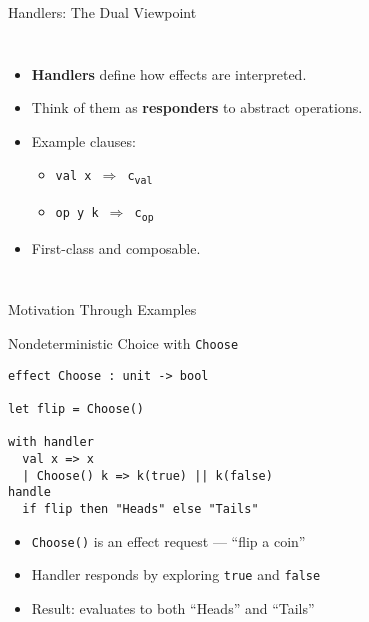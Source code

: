\begin{frame}{Handlers: The Dual Viewpoint}
  \begin{columns}[c]
    \begin{itemize}
      \item \textbf{Handlers} define how effects are interpreted.
      \vspace{0.5em}
      \item Think of them as \textbf{responders} to abstract operations.
      \vspace{0.5em}
      \item Example clauses:
      \begin{itemize}
        \item \texttt{val x $\Rightarrow$ c\textsubscript{val}}
        \item \texttt{op y k $\Rightarrow$ c\textsubscript{op}}
      \end{itemize}
      \vspace{0.5em}
      \item First-class and composable.
    \end{itemize}

    \centering
    \resizebox{0.8\linewidth}{!}{%
  
}
    
  \end{columns}
\end{frame}

\begin{frame}[fragile]{Motivation Through Examples}
\vspace{-0.5em}
\begin{block}{Nondeterministic Choice with \texttt{Choose}}
\begin{verbatim}
effect Choose : unit -> bool

let flip = Choose()

with handler
  val x => x
  | Choose() k => k(true) || k(false)
handle
  if flip then "Heads" else "Tails"
\end{verbatim}
\end{block}
\vspace{0.5em}
\begin{itemize}
  \item \texttt{Choose()} is an effect request — “flip a coin”
  \item Handler responds by exploring \texttt{true} and \texttt{false}
  \item Result: evaluates to both “Heads” and “Tails”
\end{itemize}
\end{frame}

